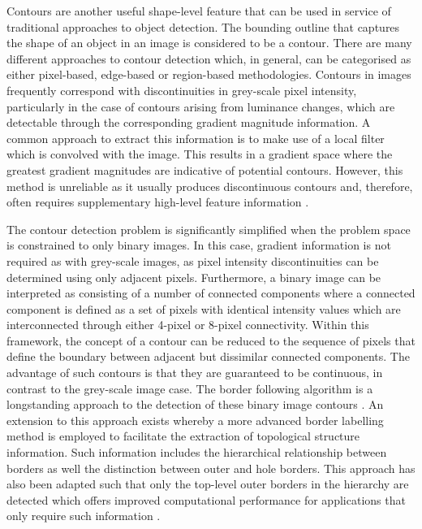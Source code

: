 Contours are another useful shape-level feature that can be used in service of traditional approaches to object detection. The bounding outline that captures the shape of an object in an image is considered to be a contour. There are many different approaches to contour detection which, in general, can be categorised as either pixel-based, edge-based or region-based methodologies. Contours in images frequently correspond with discontinuities in grey-scale pixel intensity, particularly in the case of contours arising from luminance changes, which are detectable through the corresponding gradient magnitude information. A common approach to  extract this information is to make use of a local filter which is convolved with the image. This results in a gradient space where the greatest gradient magnitudes are indicative of potential contours. However, this method is unreliable as it usually produces discontinuous contours and, therefore, often requires supplementary high-level feature information \cite{Gong2018:Overview_of_Contour_Detection_Approaches}.

The contour detection problem is significantly simplified when the problem space is constrained to only binary images. In this case, gradient information is not required as with grey-scale images, as pixel intensity discontinuities can be determined using only adjacent pixels. Furthermore, a binary image can be interpreted as consisting of a number of connected components where a connected component is defined as a set of pixels with identical intensity values which are interconnected through either 4-pixel or 8-pixel connectivity. Within this framework, the concept of a contour can be reduced to the sequence of pixels that define the boundary between adjacent but dissimilar connected components. The advantage of such contours is that they are guaranteed to be continuous, in contrast to the grey-scale image case. The border following algorithm is a longstanding approach to the detection of these binary image contours \cite{Suzuki:Binary_Image_Topological_Structural_Analysis}. An extension to this approach exists whereby a more advanced border labelling method is employed to facilitate the extraction of topological structure information. Such information includes the hierarchical relationship between borders as well the distinction between outer and hole borders. This approach has also been adapted such that only the top-level outer borders in the hierarchy are detected which offers improved computational performance for applications that only require such information \cite{Yokoi:Binary_Image_Topological_Properties_Analysis}.

